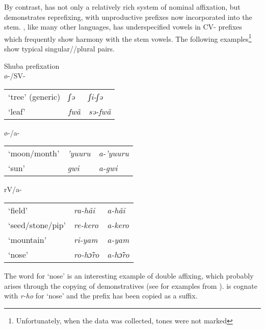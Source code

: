 \documentclass[output=paper]{langsci/langscibook}
\begin{document}
By contrast,  has not only a relatively rich system of nominal affixation, but demonstrates reprefixing, with unproductive prefixes now incorporated into the stem. , like many other  languages, has underspecified vowels in CV- prefixes which frequently show harmony with the stem vowels. The following examples\footnote{Unfortunately, when the data was collected, tones were not marked} show typical singular//plural pairs.

\ea
{Shuba prefixation}\\

\ea
ø-/SV-\\
\begin{tabularx}{.8\textwidth}{XXX} 
‘tree’ (generic)	&   \textit{ʃə}	&  \textit{ʃi-ʃə}\\
‘leaf’	&  \textit{fwã} 	&  \textit{sə-fwã} \\ 
\end{tabularx}
\ex ø-/a-

\begin{tabularx}{.8\textwidth}{XXX} 
‘moon/month’	&  \textit{’yuuru}	&  \textit{a-’yuuru}\\
‘sun’	&  \textit{gwi}	&  \textit{a-gwi}\\ 
\end{tabularx}
\ex   rV/a-

\begin{tabularx}{.8\textwidth}{XXX}
‘field’	&  \textit{ra-hãi}	&  \textit{a-hãi}\\
‘seed/stone/pip’	&  \textit{re-kero}	&  \textit{a-kero}\\
‘mountain’	&  \textit{ri-yam}	&  \textit{a-yam}\\
‘nose’	& \textit{ro-hɔ̃ro}	&  \textit{a-hɔ̃ro}\\
\end{tabularx} 
\z\z

The word for ‘nose’ is an interesting example of double affixing, which probably arises through the copying of demonstratives (see \citealt{Hoffmann1967} for examples from ).  is cognate with  \textit{r-ho} for ‘nose’ and the prefix has been copied as a suffix.
\end{document}
